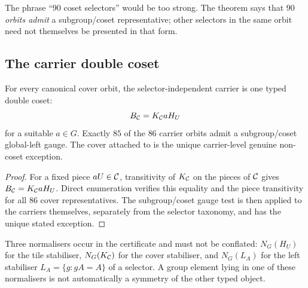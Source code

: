 The phrase ``$90$ coset selectors'' would be too strong.  The theorem says
that $90$ \emph{orbits admit} a subgroup/coset representative; other
selectors in the same orbit need not themselves be presented in that form.

\subsection{The carrier double coset}

\begin{theorem}\label{thm:carrier}
For every canonical cover orbit, the selector-independent carrier is one
typed double coset:
\[
 B_\mathcal C=K_\mathcal C aH_U
\]
for a suitable $a\in G$.  Exactly $85$ of the $86$ carrier orbits admit a
subgroup/coset global-left gauge.  The cover attached to
 is the unique carrier-level genuine non-coset exception.
\end{theorem}
\begin{proof}
For a fixed piece $aU\in\mathcal C$, transitivity of $K_\mathcal C$ on the pieces of $\mathcal C$
gives $B_\mathcal C=K_\mathcal C aH_U$.  Direct enumeration verifies this equality and the
piece transitivity for all $86$ cover representatives.  The subgroup/coset
gauge test is then applied to the carriers themselves, separately from the
selector taxonomy, and has the unique stated exception.
\end{proof}

Three normalisers occur in the certificate and must not be conflated:
$N_G(H_U)$ for the tile stabiliser, $N_G(K_\mathcal C)$ for the cover stabiliser, and
$N_G(L_A)$ for the left stabiliser $L_A=\{g:gA=A\}$ of a selector.  A group
element lying in one of these normalisers is not automatically a symmetry of
the other typed object.
